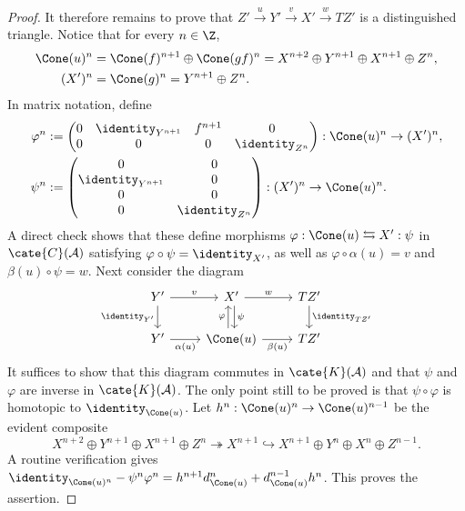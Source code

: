 \begin{proof}
	It therefore remains to prove that
	$Z' \xrightarrow{u} Y' \xrightarrow{v} X' \xrightarrow{w} TZ'$ is a
	distinguished triangle. Notice that for every $n \in \Z$,
	\begin{align*}
		\Cone(u)^n & = \Cone(f)^{n+1} \oplus \Cone(gf)^n = X^{n+2} \oplus Y^{n+1} \oplus X^{n+1} \oplus Z^n , \\
		(X')^n & = \Cone(g)^n = Y^{n+1} \oplus Z^n .
	\end{align*}
	In matrix notation, define
	\begin{align*}
		\varphi^n & := \begin{pmatrix} 0 & \identity_{Y^{n+1}} & f^{n+1} & 0 \\ 0 & 0 & 0 & \identity_{Z^n} \end{pmatrix} : \Cone(u)^n \to (X')^n , \\
		\psi^n & := \begin{pmatrix} 0 & 0 \\ \identity_{Y^{n+1}} & 0 \\ 0 & 0 \\ 0 & \identity_{Z^n} \end{pmatrix} : (X')^n \to \Cone(u)^n .
	\end{align*}
	A direct check shows that these define morphisms
	$\varphi: \Cone(u) \leftrightarrows X' : \psi$ in
	$\cate{C}(\mathcal{A})$ satisfying
	$\varphi \circ \psi = \identity_{X'}$, as well as
	$\varphi \circ \alpha(u) = v$ and $\beta(u) \circ \psi = w$. Next
	consider the diagram
	\[\begin{tikzcd}
		Y' \arrow[r, "v"] \arrow[d, "\identity_{Y'}"'] & X' \arrow[r, "w"] \arrow[shift left, d, "\psi"] & TZ' \arrow[d, "\identity_{TZ'}"] \\
		Y' \arrow[r, "\alpha(u)"'] & \Cone(u) \arrow[r, "\beta(u)"'] \arrow[shift left, u, "\varphi"] & TZ'
	\end{tikzcd}\]
	It suffices to show that this diagram commutes in
	$\cate{K}(\mathcal{A})$ and that $\psi$ and $\varphi$ are inverse in
	$\cate{K}(\mathcal{A})$. The only point still to be proved is that
	$\psi \circ \varphi$ is homotopic to $\identity_{\Cone(u)}$. Let
	$h^n : \Cone(u)^n \to \Cone(u)^{n-1}$ be the evident composite
	\[ X^{n+2} \oplus Y^{n+1} \oplus X^{n+1} \oplus Z^n \twoheadrightarrow X^{n+1} \hookrightarrow X^{n+1} \oplus Y^n \oplus X^n \oplus Z^{n-1}. \]
	A routine verification gives
	$\identity_{\Cone(u)^n} - \psi^n \varphi^n = h^{n+1} d_{\Cone(u)}^n + d_{\Cone(u)}^{n-1} h^n$.
	This proves the assertion.
\end{proof}

